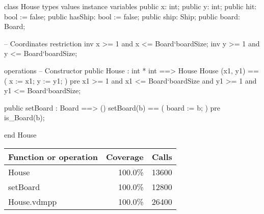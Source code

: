 \begin{vdm_al}
class House
 types
 values
 instance variables
 public x: int;
 public y: int;
 public hit: bool := false;
 public hasShip: bool := false;
 public ship: Ship;
 public board: Board;

 -- Coordinates restriction 
 inv x >= 1 and x <= Board`boardSize;
 inv y >= 1 and y <= Board`boardSize;
  
 operations
  -- Constructor
  public House : int * int ==> House
   House (x1, y1) ==
   (
    x := x1;
    y := y1;
   )
  pre x1 >= 1 and x1 <= Board`boardSize and
   y1 >= 1 and y1 <= Board`boardSize;
  
  public setBoard : Board ==> ()
   setBoard(b) ==
   (
    board := b;
   )
  pre is_Board(b);
  
end House
\end{vdm_al}
\bigskip
\begin{longtable}{|l|r|r|}
\hline
Function or operation & Coverage & Calls \\
\hline
\hline
House & 100.0\% & 13600 \\
\hline
setBoard & 100.0\% & 12800 \\
\hline
\hline
House.vdmpp & 100.0\% & 26400 \\
\hline
\end{longtable}

